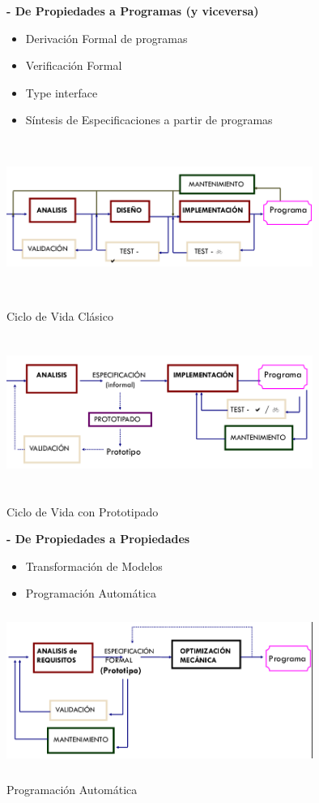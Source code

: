 \documentclass[12pt]{amsart}
\begin{document}
    \textbf{- De Propiedades a Programas (y viceversa)}

    \begin{itemize}
        \item \textrightarrow Derivación Formal de programas
        \item \textleftarrow Verificación Formal 
        \item \textleftarrow Type interface
        \item \textleftarrow Síntesis de Especificaciones a
        partir de programas
    \end{itemize}
    \begin{center}
        \includegraphics[width=10cm, height=5cm]{t2clasico.png}
        
        Ciclo de Vida Clásico

        \medskip

        \includegraphics[width=10cm, height=5cm]{t2prototipo.png}
        
        Ciclo de Vida con Prototipado
    \end{center}
    
    \textbf{- De Propiedades a Propiedades}

    \begin{itemize}
        \item \textrightarrow Transformación de Modelos
        \item \textrightarrow Programación Automática
    \end{itemize}

    \begin{center}
        \includegraphics[width=10cm, height=5cm]{t2progauto.png}
        
        Programación Automática
    \end{center}

    

    
    
\end{document}

